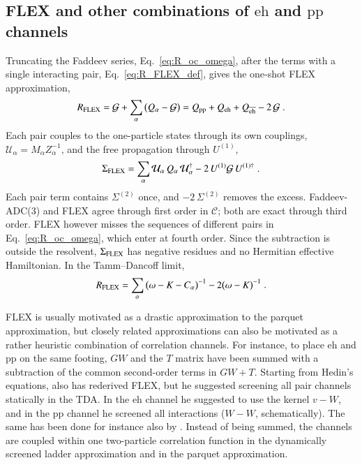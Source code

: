 \documentclass[aip,jcp,reprint,noshowkeys,superscriptaddress]{revtex4-1}
\newcommand{\eh}{\text{eh}}
\newcommand{\teh}{\overline{\text{eh}}}
\newcommand{\pp}{\text{pp}}
\begin{document}
\subsection{FLEX and other combinations of $\eh$ and $\pp$ channels}
\label{sec:flex}
Truncating the Faddeev series, Eq.~\eqref{eq:R_oc_omega}, after the
terms with a single interacting pair, Eq.~\eqref{eq:R_FLEX_def}, gives the one-shot FLEX
approximation,\cite{Bickers1989,Bickers2004}
\begin{equation}
R_{\rm FLEX}
=
\mathcal G+\sum_\alpha\big(Q_\alpha-\mathcal G\big)
=
Q_{\pp}+Q_{\eh}+Q_{\teh}-2\,\mathcal G \;.
\nonumber
\end{equation}
Each pair couples to the one-particle states through its own couplings,
$\mathcal U_\alpha=M_\alpha Z_\alpha^{-1}$, and the free propagation through
$U^{(1)}$,
\begin{equation}
\Sigma_{\rm FLEX}
=
\sum_\alpha\mathcal U_\alpha\,Q_\alpha\,\mathcal U_\alpha^\dagger
-2\,U^{(1)}\mathcal G\,U^{(1)\dagger} \;.
\label{eq:FLEX}
\end{equation}
Each pair term contains $\Sigma^{(2)}$ once, and $-2\,\Sigma^{(2)}$
removes the excess. Faddeev-ADC(3) and FLEX 
agree through first order in $\mathcal C$; both are exact
through third order. FLEX however misses the sequences of different pairs in
Eq.~\eqref{eq:R_oc_omega}, which enter at fourth order. Since the
subtraction is outside the resolvent, $\Sigma_{\rm FLEX}$ has negative
residues and no Hermitian effective Hamiltonian. In the Tamm--Dancoff
limit,
\begin{equation}
R_{\rm FLEX}
=
\sum_\alpha\big(\omega-K-C_\alpha\big)^{-1}-2\big(\omega-K\big)^{-1} \;.
\nonumber
\end{equation}

FLEX is usually motivated as a drastic approximation to the parquet 
approximation,\cite{Bickers2004,MarieLoos2025} but closely related 
approximations can also be motivated as a rather heuristic combination 
of correlation channels. For instance, to place $\eh$ and $\pp$ on the 
same footing, $GW$ and
the $T$ matrix have been summed with a subtraction of the common second-order
terms in $GW+T$.\cite{Springer1998,Zhukov2004}
Starting from Hedin's equations, also \citet{Cunningham2024} has 
rederived FLEX, but he suggested screening all pair channels statically in the TDA. 
In the $\eh$ channel he suggested to use the kernel $v-W$, and in the $\pp$
channel he screened all interactions ($W-W$, schematically). The 
same has been done for instance also by \citet{romaniello2026direct}.
Instead of being summed, the channels are coupled within one
two-particle correlation function in the dynamically screened ladder
approximation\cite{Joost2022,Bonitz2024} and in the parquet
approximation.\cite{Bickers1991,Yang2009,MarieLoos2025}
\end{document}
